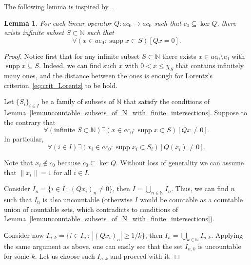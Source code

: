 \documentclass[a4paper,14pt]{article} %
\DeclareMathOperator{\supp}{supp}
\theoremstyle{plain}
\newtheorem{lemma}[theorem]{Lemma}
\theoremstyle{definition}
\begin{document}
The following lemma is inspired by~\cite{mathSE_Phillips}.

\begin{lemma}
	\label{lem:c_0_not_complemented_in_ac_0}
	For each linear operator $Q: ac_0 \to ac_0$ such that $c_0\subseteq \ker Q$,
	there exists infinite subset $S \subset \mathbb{N}$ such that
	\begin{equation}
		\forall(x \in ac_0 : \supp x \subset S)[Qx = 0]
		.
	\end{equation}
\end{lemma}



\begin{proof}
	Notice first that for any infinite subset $S \subset \mathbb{N}$
	there exists $x\in ac_0\setminus c_0$ with $\supp x \subseteq S$.
	Indeed, we can find such $x$ with $0 < x \leq \chi_S$
	that contains infinitely many ones, and the distance between the ones
	is enough for Lorentz's criterion~\eqref{eq:crit_Lorentz} to be hold.



	Let $\{S_i\}_{i \in I}$ be a family of subsets of $\mathbb{N}$
	that satisfy the conditions of Lemma~\ref{lem:uncountable_subsets_of_N_with_finite_intersections}.
	Suppose to the contrary that
	\begin{equation}
		\forall(\mbox{infinite }S\subset\mathbb{N})\exists(x \in ac_0 : \supp x \subset S)[Qx \neq 0]
		.
	\end{equation}
	In particular,
	\begin{equation}
		\forall(i\in I)\exists(x_i \in ac_0 : \supp x_i \subset S_i)[Q(x_i) \neq 0]
		.
	\end{equation}

	Note that $x_i \notin c_0$ because $c_0\subseteq \ker Q$.
	Without loss of generality we can assume that $\|x_i\|=1$ for all $i \in I$.

	Consider $I_n = \{i \in I\,:\,(Qx_i)_n \neq 0\}$,
	then $I = \bigcup\limits_{n\in\mathbb{N}} I_n$.
	Thus, we can find $n$ such that $I_n$ is also uncountable
	(otherwise $I$ would be countable as a countable union of countable sets,
	which contradicts to conditions of Lemma~\ref{lem:uncountable_subsets_of_N_with_finite_intersections}).

	Сonsider now $I_{n,k} = \{i \in I_n\,:\,|(Qx_i)_n| \geq 1/k\}$,
	then $I_n = \bigcup\limits_{k\in\mathbb{N}} I_{n,k}$.
	Applying the same argument as above, one can easily see that the set $I_{n,k}$ is uncountable for some $k$.
	Let us choose such $I_{n,k}$ and proceed with it.


\end{proof}
\end{document}
